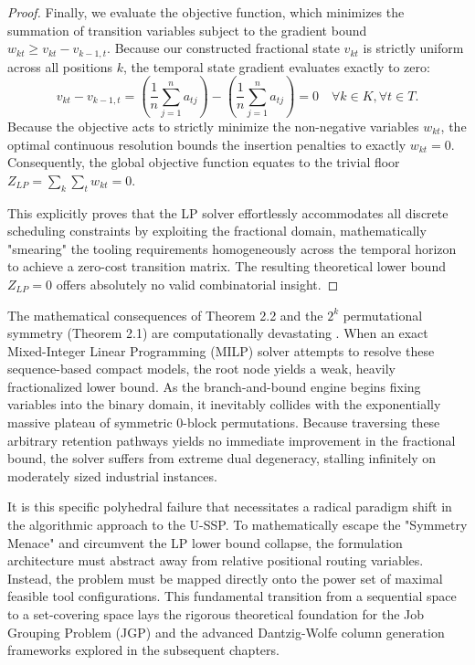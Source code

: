 \documentclass[11pt, a4paper]{book}
\begin{document}
\begin{proof}
		Finally, we evaluate the objective function, which minimizes the summation of transition variables subject to the gradient bound $w_{kt} \ge v_{kt} - v_{k-1,t}$. Because our constructed fractional state $v_{kt}$ is strictly uniform across all positions $k$, the temporal state gradient evaluates exactly to zero:
		\begin{equation}
			v_{kt} - v_{k-1,t} = \left( \frac{1}{n} \sum_{j=1}^{n} a_{tj} \right) - \left( \frac{1}{n} \sum_{j=1}^{n} a_{tj} \right) = 0 \quad \forall k \in K, \forall t \in T.
		\end{equation}
		Because the objective acts to strictly minimize the non-negative variables $w_{kt}$, the optimal continuous resolution bounds the insertion penalties to exactly $w_{kt} = 0$. Consequently, the global objective function equates to the trivial floor $Z_{LP} = \sum_k \sum_t w_{kt} = 0$.
		
		This explicitly proves that the LP solver effortlessly accommodates all discrete scheduling constraints by exploiting the fractional domain, mathematically "smearing" the tooling requirements homogeneously across the temporal horizon to achieve a zero-cost transition matrix. The resulting theoretical lower bound $Z_{LP} = 0$ offers absolutely no valid combinatorial insight.
	\end{proof}
	
	The mathematical consequences of Theorem 2.2 and the $2^k$ permutational symmetry (Theorem 2.1) are computationally devastating \cite{Catanzaro2015, Laporte2004}. When an exact Mixed-Integer Linear Programming (MILP) solver attempts to resolve these sequence-based compact models, the root node yields a weak, heavily fractionalized lower bound. As the branch-and-bound engine begins fixing variables into the binary domain, it inevitably collides with the exponentially massive plateau of symmetric $0$-block permutations. Because traversing these arbitrary retention pathways yields no immediate improvement in the fractional bound, the solver suffers from extreme dual degeneracy, stalling infinitely on moderately sized industrial instances.
	
	It is this specific polyhedral failure that necessitates a radical paradigm shift in the algorithmic approach to the U-SSP. To mathematically escape the "Symmetry Menace" and circumvent the LP lower bound collapse, the formulation architecture must abstract away from relative positional routing variables. Instead, the problem must be mapped directly onto the power set of maximal feasible tool configurations. This fundamental transition from a sequential space to a set-covering space lays the rigorous theoretical foundation for the Job Grouping Problem (JGP) and the advanced Dantzig-Wolfe column generation frameworks explored in the subsequent chapters.
	
\end{document}
